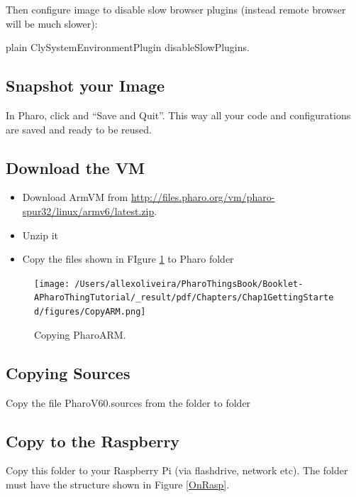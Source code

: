 \documentclass[10pt,twoside,english]{_support/latex/sbabook/sbabook}
\begin{document}
Then configure image to disable slow browser plugins (instead remote browser will be much slower):

\begin{displaycode}{plain}
ClySystemEnvironmentPlugin disableSlowPlugins.
\end{displaycode}
\subsection{Snapshot your Image}
 In Pharo, click and “Save and Quit”. This way all your code and configurations are saved and ready to be reused.
 
 
\subsection{Download the VM}
\begin{itemize}
\item Download ArmVM from \url{http://files.pharo.org/vm/pharo-spur32/linux/armv6/latest.zip}.
\item Unzip it
\item Copy the files shown in FIgure \ref{CopyARM}  to Pharo folder  
\end{itemize}


\begin{figure}

\begin{center}
\texttt{[image: /Users/allexoliveira/PharoThingsBook/Booklet-APharoThingTutorial/\_result/pdf/Chapters/Chap1GettingStarted/figures/CopyARM.png]}\caption{Copying PharoARM.\label{CopyARM}}\end{center}
\end{figure}

\subsection{Copying Sources}
Copy the file PharoV60.sources from the folder  to folder 
\subsection{Copy to the Raspberry}
Copy this folder to your Raspberry Pi (via flashdrive, network etc). The folder must have the structure shown in Figure \ref{OnRasp}.
\end{document}
